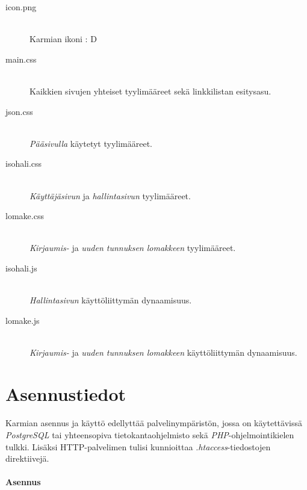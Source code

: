 \documentclass[11pt]{article}
\begin{document}
\begin{description}
\item[icon.png] \hfill \\
Karmian ikoni : D
\item[main.css] \hfill \\
Kaikkien sivujen yhteiset tyylimääreet sekä linkkilistan esitysasu.
\item[json.css] \hfill \\
\emph{Pääsivulla} käytetyt tyylimääreet.
\item[isohali.css] \hfill \\
\emph{Käyttäjäsivun} ja \emph{hallintasivun} tyylimääreet.
\item[lomake.css] \hfill \\
\emph{Kirjaumis-} ja \emph{uuden tunnuksen lomakkeen} tyylimääreet.
\item[isohali.js] \hfill \\
\emph{Hallintasivun} käyttöliittymän dynaamisuus.
\item[lomake.js] \hfill \\
\emph{Kirjaumis-} ja \emph{uuden tunnuksen lomakkeen} käyttöliittymän dynaamisuus.
\end{description}


\section{Asennustiedot}

\paragraph{} Karmian asennus ja käyttö edellyttää palvelinympäristön, jossa on käytettävissä \emph{PostgreSQL} tai yhteensopiva tietokantaohjelmisto sekä \emph{PHP}-ohjelmointikielen tulkki. Lisäksi HTTP-palvelimen tulisi kunnioittaa \emph{.htaccess}-tiedostojen direktiivejä.

\paragraph{Asennus}
\end{document}
